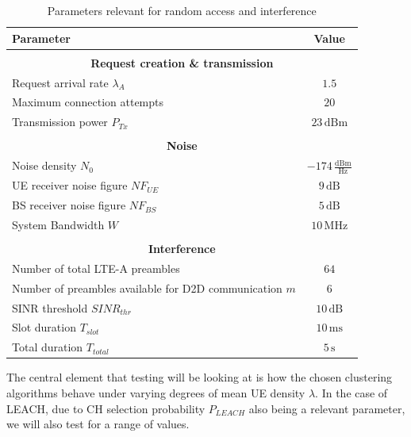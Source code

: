 \begin{table}
\begin{center}
 \begin{tabular}{||p{10.5cm}|p{2.5cm}||} 
 \hline
 \textbf{Parameter} & \multicolumn{1}{|c||}{\textbf{Value}}\\
 \hline
 \multicolumn{2}{c}{} \\[-0.7em]
 \hline
 \multicolumn{2}{||c||}{\textbf{Request creation \& transmission}} \\
 \hline
 Request arrival rate $\lambda_A$ & \multicolumn{1}{|c||}{$1.5$} \\ 
 \hline
 Maximum connection attempts & \multicolumn{1}{|c||}{$20$} \\ 
 \hline
 Transmission power $P_{Tx}$& \multicolumn{1}{|c||}{$23\,\text{dBm}$} \\
 \hline
 \multicolumn{2}{c}{} \\[-0.7em]
 \hline
 \multicolumn{2}{||c||}{\textbf{Noise}} \\
 \hline
 Noise density $N_0$ & \multicolumn{1}{|c||}{$-174\,\frac{\text{dBm}}{\text{Hz}}$}\\
 \hline
 UE receiver noise figure $NF_{UE}$ & \multicolumn{1}{|c||}{$9\,\text{dB}$}\\
 \hline
 BS receiver noise figure $NF_{BS}$ & \multicolumn{1}{|c||}{$5\,\text{dB}$} \\
 \hline
 System Bandwidth $W$ & \multicolumn{1}{|c||}{$10\,\text{MHz}$} \\
 \hline
 \multicolumn{2}{c}{} \\[-0.7em]
 \hline
 \multicolumn{2}{||c||}{\textbf{Interference}} \\
 \hline
 Number of total LTE-A preambles & \multicolumn{1}{|c||}{$64$} \\
 \hline
 Number of preambles available for D2D communication $m$& \multicolumn{1}{|c||}{$6$}\\
 \hline
 SINR threshold $SINR_{thr}$ & \multicolumn{1}{|c||}{$10\,\text{dB}$}\\
 \hline
 Slot duration $T_{slot}$ & \multicolumn{1}{|c||}{$10\,\text{ms}$}\\
 \hline
 Total duration $T_{total}$ &\multicolumn{1}{|c||}{$5\,\text{s}$}\\
 \hline
\end{tabular}
\end{center}
\caption{Parameters relevant for random access and interference}
\label{tbl:RA}
\end{table}

The central element that testing will be looking at is how the chosen clustering algorithms behave under varying degrees of mean UE density $\lambda$. In the case of LEACH, due to CH selection probability $P_{LEACH}$ also being a relevant parameter, we will also test for a range of values. 

